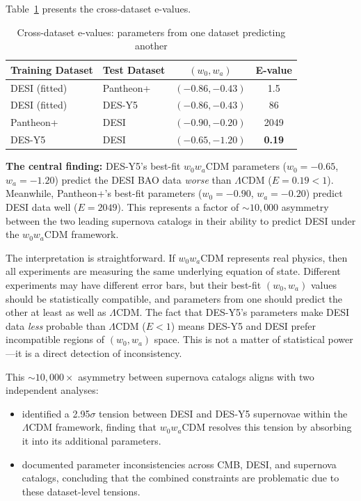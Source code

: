 \documentclass[11pt,a4paper]{article}
\newcommand{\LCDM}{$\Lambda$CDM}
\begin{document}
Table~\ref{tab:cross} presents the cross-dataset e-values.

\begin{table}[H]
\centering
\caption{Cross-dataset e-values: parameters from one dataset predicting another}
\label{tab:cross}
\begin{tabular}{@{}llcc@{}}
\toprule
Training Dataset & Test Dataset & $(w_0, w_a)$ & E-value \\
\midrule
DESI (fitted) & Pantheon+ & $(-0.86, -0.43)$ & 1.5 \\
DESI (fitted) & DES-Y5 & $(-0.86, -0.43)$ & 86 \\
Pantheon+ & DESI & $(-0.90, -0.20)$ & 2049 \\
DES-Y5 & DESI & $(-0.65, -1.20)$ & \textbf{0.19} \\
\bottomrule
\end{tabular}
\end{table}

\textbf{The central finding:} DES-Y5's best-fit $w_0w_a$CDM parameters ($w_0 = -0.65$, $w_a = -1.20$) predict the DESI BAO data \textit{worse} than \LCDM{} ($E = 0.19 < 1$). Meanwhile, Pantheon+'s best-fit parameters ($w_0 = -0.90$, $w_a = -0.20$) predict DESI data well ($E = 2049$). This represents a factor of ${\sim}10{,}000$ asymmetry between the two leading supernova catalogs in their ability to predict DESI under the $w_0w_a$CDM framework.

The interpretation is straightforward. If $w_0w_a$CDM represents real physics, then all experiments are measuring the same underlying equation of state. Different experiments may have different error bars, but their best-fit $(w_0, w_a)$ values should be statistically compatible, and parameters from one should predict the other at least as well as \LCDM. The fact that DES-Y5's parameters make DESI data \textit{less} probable than \LCDM{} ($E < 1$) means DES-Y5 and DESI prefer incompatible regions of $(w_0, w_a)$ space. This is not a matter of statistical power---it is a direct detection of inconsistency.

This ${\sim}10{,}000\times$ asymmetry between supernova catalogs aligns with two independent analyses:
\begin{itemize}
    \item \citet{OngBayesian2025} identified a 2.95$\sigma$ tension between DESI and DES-Y5 supernovae within the \LCDM{} framework, finding that $w_0w_a$CDM resolves this tension by absorbing it into its additional parameters.
    \item \citet{WangMota2025} documented parameter inconsistencies across CMB, DESI, and supernova catalogs, concluding that the combined constraints are problematic due to these dataset-level tensions.
\end{itemize}
\end{document}
